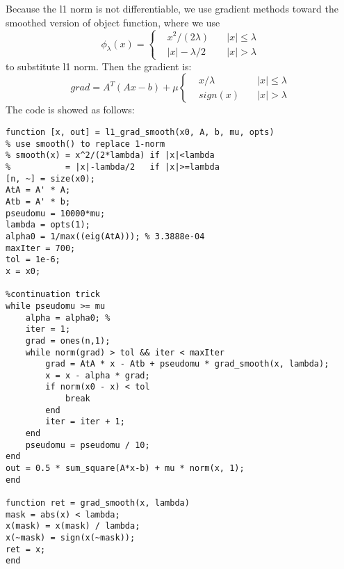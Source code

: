 \documentclass[11pt, oneside]{article}   	%
\begin{document}
Because the l1 norm is not differentiable, we use gradient methods toward the smoothed version of object function, where we use
\begin{equation}
  \phi_{\lambda}(x)=\left\{
    \begin{aligned}
      &x^{2}/(2\lambda)\quad&|x|\leq\lambda\\
      &|x|-\lambda/2\quad& |x|>\lambda
    \end{aligned}
    \right.
\end{equation}
to substitute l1 norm. Then the gradient is:
\begin{equation}
  grad=A^{T}(Ax-b)+\mu\left\{
    \begin{aligned}
      &x/\lambda\quad&|x|\leq\lambda\\
      &sign(x)\quad& |x|>\lambda
    \end{aligned}
    \right.
\end{equation}
The code is showed as follows:
\lstset{
 frame=single, 
breaklines=true,
language=MATLAB,
 }
\begin{lstlisting}
function [x, out] = l1_grad_smooth(x0, A, b, mu, opts)
% use smooth() to replace 1-norm
% smooth(x) = x^2/(2*lambda) if |x|<lambda
%           = |x|-lambda/2   if |x|>=lambda
[n, ~] = size(x0);
AtA = A' * A;
Atb = A' * b;
pseudomu = 10000*mu;
lambda = opts(1);
alpha0 = 1/max((eig(AtA))); % 3.3888e-04
maxIter = 700;
tol = 1e-6;
x = x0;

%continuation trick
while pseudomu >= mu
    alpha = alpha0; %
    iter = 1;
    grad = ones(n,1);
    while norm(grad) > tol && iter < maxIter
        grad = AtA * x - Atb + pseudomu * grad_smooth(x, lambda);
        x = x - alpha * grad;
        if norm(x0 - x) < tol
            break
        end
        iter = iter + 1;
    end
    pseudomu = pseudomu / 10;
end
out = 0.5 * sum_square(A*x-b) + mu * norm(x, 1);
end

function ret = grad_smooth(x, lambda)
mask = abs(x) < lambda;
x(mask) = x(mask) / lambda;
x(~mask) = sign(x(~mask));
ret = x;
end
\end{lstlisting}
\end{document}
